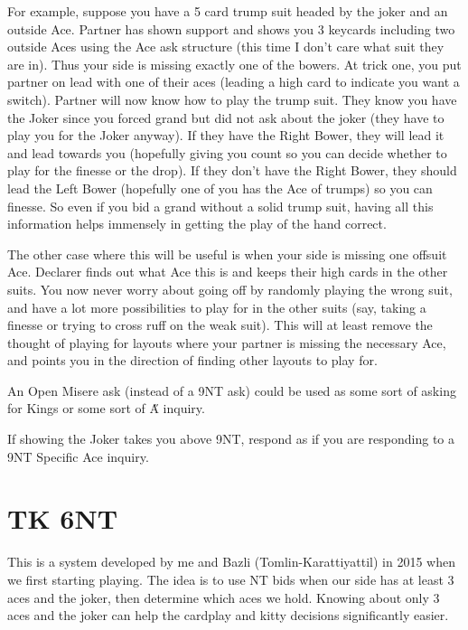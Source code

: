 \documentclass[a4paper]{JoshCards}
\begin{document}
  For example, suppose you have a 5 card trump suit headed by the joker and an outside Ace. Partner has shown support and shows you 3 keycards including two outside Aces using the Ace ask structure (this time I don't care what suit they are in). Thus your side is missing exactly one of the bowers. At trick one, you put partner on lead with one of their aces (leading a high card to indicate you want a switch). Partner will now know how to play the trump suit. They know you have the Joker since you forced grand but did not ask about the joker (they have to play you for the Joker anyway). If they have the Right Bower, they will lead it and lead towards you (hopefully giving you count so you can decide whether to play for the finesse or the drop). If they don't have the Right Bower, they should lead the Left Bower (hopefully one of you has the Ace of trumps) so you can finesse. So even if you bid a grand without a solid trump suit, having all this information helps immensely in getting the play of the hand correct.

  The other case where this will be useful is when your side is missing one offsuit Ace. Declarer finds out what Ace this is and keeps their high cards in the other suits. You now never worry about going off by randomly playing the wrong suit, and have a lot more possibilities to play for in the other suits (say, taking a finesse or trying to cross ruff on the weak suit). This will at least remove the thought of playing for layouts where your partner is missing the necessary Ace, and points you in the direction of finding other layouts to play for.



  An Open Misere ask (instead of a 9NT ask) could be used as some sort of asking for Kings or some sort of \H A inquiry. 

  If showing the Joker takes you above 9NT, respond as if you are responding to a 9NT Specific Ace inquiry. 




\newpage
\section*{TK 6NT}


This is a system developed by me and Bazli (Tomlin-Karattiyattil) in 2015 when we first starting playing. The idea is to use NT bids when our side has at least 3 aces and the joker, then determine which aces we hold. Knowing about only 3 aces and the joker can help the cardplay and kitty decisions significantly easier.
\end{document}

